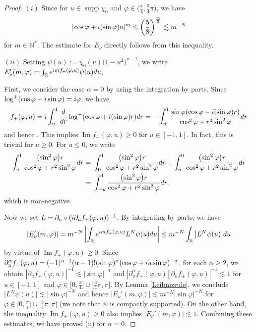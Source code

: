 \documentclass[11pt]{article}
\numberwithin{equation}{section}
\def\R{\mathbb{R}}%
\DeclareMathOperator{\supp}{supp}%
\DeclareMathOperator{\im}{Im}%
\def\a{\alpha}
\def\f{\varphi}
\def\g{\psi}
\def\n{\nu}
\def\pa{\partial}
\begin{document}
\begin{proof}
 $(i)$ Since \smash{$|\cos\f+{\rm i}(\sin \f)u|\leq \sqrt{\frac{5}{8}}$} for $u\in \supp \chi_0$ and $\f\in \bigl(\frac{\pi}{4}, \frac{3}{4}\pi\bigr)$, we have
 \[
|\cos\f+{\rm i}(\sin \f)u|^m\leq \left(\frac{5}{8}\right)^{\frac{m}{2}}\lesssim m^{-N}
\]
 for $m\in\mathbb{N}^*$. The estimate for $E_{\n}$ directly follows from this inequality.

 $(ii)$ Setting $\g(u):=\chi_0(u)\bigl(1-u^2\bigr)^{\n-1}$, we write $E_{\n}'(m,\f)=\int_{\R}{\rm e}^{{\rm i}mf_{+}(\f,u)}\g(u){\rm d}u$.

First, we consider the case $\a=0$ by using the integration by parts.
Since $\log^+(\cos \f+{\rm i}\sin \f)={\rm i}\f$, we have
\begin{align}\label{f_+rep}
f_+(\f,u)={\rm i}\int_u^1\frac{{\rm d}}{{\rm d}r}\log^+(\cos \f+{\rm i}(\sin \f) r){\rm d}r=-\int_u^1\frac{\sin\f(\cos \f-{\rm i}(\sin \f) r)}{\cos^2 \f+r^2\sin^2 \f }{\rm d}r
\end{align}
and hence \smash{$\im f_+(\f,u)=\int_u^1\frac{(\sin^2 \f) r}{\cos^2 \f+r^2\sin^2 \f }{\rm d}r$}. This implies $\im f_+(\f,u)\geq 0$ for $u\in [-1,1]$. In fact, this is trivial for $u\geq 0$. For $u\leq 0$, we write
\begin{align*}
\int_u^1\frac{\bigl(\sin^2 \f\bigr) r}{\cos^2 \f+r^2\sin^2 \f }{\rm d}r={}&\int_0^1\frac{\bigl(\sin^2 \f\bigr) r}{\cos^2 \f+r^2\sin^2 \f }{\rm d}r+\int_u^0\frac{\bigl(\sin^2 \f\bigr) r}{\cos^2 \f+r^2\sin^2 \f }{\rm d}r\\
={}&\int_{-u}^1\frac{\bigl(\sin^2 \f\bigr) r}{\cos^2 \f+r^2\sin^2 \f }{\rm d}r,
\end{align*}
 which is non-negative.

Now we set $L=\pa_u\circ ({\rm i}\pa_uf_+(\f,u))^{-1}$. By integrating by parts, we have
\[
|E_{\n}'(m,\f)|=m^{-N}\left|\int_{\R}{\rm e}^{{\rm i}mf_{+}(\f,u)} L^N\g(u){\rm d}u\right|\leq m^{-N}\int_{\R}\big| L^N\g(u)\big|{\rm d}u
\]
 by virtue of $\im f_+(\f,u)\geq 0$. Since $\pa_u^{\a}f_+(\f,u)=(-1)^{\a-1}(\a-1)!(\sin\f)^{\a}(\cos \f+{\rm i}u\sin \f )^{-\a}$, for each $\a\geq 2$, we obtain $|\pa_uf_+(\f,u)|^{-1}\lesssim |\sin \f|^{-1}$ and $|\pa_u^{\a}f_+(\f,u)||\pa_uf_+(\f,u)|^{-1} \lesssim 1$ for $u\in [-1,1]$ and $\f\in \bigl[0,\frac{\pi}{4}\bigr]\cup \bigl[\frac{3}{4}\pi,\pi\bigr]$. By Lemma \ref{Leibnizrule}, we conclude $\big| L^N\g(u)\big|\lesssim |\sin\f|^{-N}$ and hence $|E_{\n}'(m,\f)|\lesssim m^{-N}|\sin\f|^{-N}$ for $\f\in \bigl[0,\frac{\pi}{4}\bigr]\cup \bigl[\frac{3}{4}\pi,\pi\bigr]$ (we note that $\g$ is compactly supported). On the other hand, the inequality $\im f_+(\f,u)\geq 0$ also implies $|E_{\n}'(m,\f)|\lesssim 1$. Combining these estimates, we have proved (ii) for $\a=0$.


\end{proof}
\end{document}
